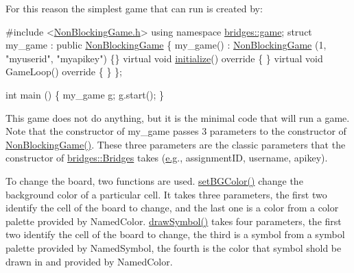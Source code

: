 For this reason the simplest game that can run is created by\+:


\begin{DoxyCode}
\textcolor{preprocessor}{#include <\mbox{\hyperlink{_non_blocking_game_8h}{NonBlockingGame.h}}>}
\textcolor{keyword}{using namespace }\mbox{\hyperlink{namespacebridges_1_1game}{bridges::game}};
\textcolor{keyword}{struct }my\_game : \textcolor{keyword}{public} \mbox{\hyperlink{classbridges_1_1game_1_1_non_blocking_game}{NonBlockingGame}} \{
  my\_game() : \mbox{\hyperlink{classbridges_1_1game_1_1_non_blocking_game}{NonBlockingGame}} (1, \textcolor{stringliteral}{"myuserid"},  \textcolor{stringliteral}{"myapikey"}) \{\}
  \textcolor{keyword}{virtual} \textcolor{keywordtype}{void} \mbox{\hyperlink{classbridges_1_1game_1_1_game_base_a9b6eb6fa7fceaac09d204b549164037f}{initialize}}()\textcolor{keyword}{ override }\{ \}
  \textcolor{keyword}{virtual} \textcolor{keywordtype}{void} GameLoop()\textcolor{keyword}{ override }\{ \}
\};

\textcolor{keywordtype}{int} main () \{
  my\_game \mbox{\hyperlink{namespacebridges_1_1game_ab9a19c7ab6e2ebac2f95180e21733487ab2f5ff47436671b6e533d8dc3614845d}{g}};
  \mbox{\hyperlink{namespacebridges_1_1game_ab9a19c7ab6e2ebac2f95180e21733487ab2f5ff47436671b6e533d8dc3614845d}{g}}.start();
\}
\end{DoxyCode}


This game does not do anything, but it is the minimal code that will run a game. Note that the constructor of my\+\_\+game passes 3 parameters to the constructor of \mbox{\hyperlink{classbridges_1_1game_1_1_non_blocking_game_a3226aa7e7ff129e916f4bd5aabcb2e72}{Non\+Blocking\+Game()}}. These three parameters are the classic parameters that the constructor of \mbox{\hyperlink{classbridges_1_1_bridges}{bridges\+::\+Bridges}} takes (\mbox{\hyperlink{namespacebridges_1_1game_ab9a19c7ab6e2ebac2f95180e21733487ab2f5ff47436671b6e533d8dc3614845d}{e.\+g}}., assignment\+ID, username, apikey).

To change the board, two functions are used. \mbox{\hyperlink{classbridges_1_1game_1_1_game_base_ab667bbca1c81e5fb3aa8d81d70fe8cd2}{set\+B\+G\+Color()}} change the background color of a particular cell. It takes three parameters, the first two identify the cell of the board to change, and the last one is a color from a color palette provided by Named\+Color. \mbox{\hyperlink{classbridges_1_1game_1_1_game_base_a415fa8f70bef364dfa966f2a86048901}{draw\+Symbol()}} takes four parameters, the first two identify the cell of the board to change, the third is a symbol from a symbol palette provided by Named\+Symbol, the fourth is the color that symbol shold be drawn in and provided by Named\+Color.

